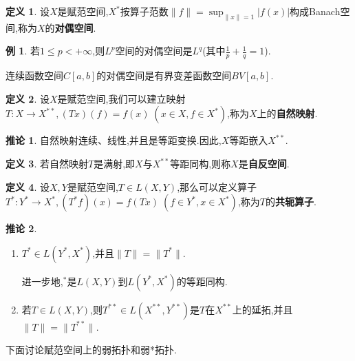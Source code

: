 \documentclass{ctexart}
\theoremstyle{definition}
\newtheorem{definition}{定义}
\newtheorem{example}{例}
\newtheorem{corollary}{推论}
\theoremstyle{remark}
\begin{document}
	\begin{definition}
		设$X$是赋范空间,$X^*$按算子范数$\|f\|=\sup_{\|x\|=1}{|f(x)|}$构成Banach空间,称为$X$的\textbf{对偶空间}.
	\end{definition}
	\begin{example}
		若$1\le p<+\infty$,则$L^p$空间的对偶空间是$L^q$(其中$\frac{1}{p}+\frac{1}{q}=1$).
		
		连续函数空间$C[a,b]$的对偶空间是有界变差函数空间$BV[a,b]$.
	\end{example}
	\begin{definition}
		设$X$是赋范空间,我们可以建立映射$T:X\to X^{**},(Tx)(f)=f(x)\;(x\in X,f\in X^*)$,称为$X$上的\textbf{自然映射}.
	\end{definition}
	\begin{corollary}
		自然映射连续、线性,并且是等距变换.因此,$X$等距嵌入$X^{**}$.
	\end{corollary}
	\begin{definition}
		若自然映射$T$是满射,即$X$与$X^{**}$等距同构,则称$X$是\textbf{自反空间}.
	\end{definition}
	\begin{definition}
		设$X,Y$是赋范空间,$T\in L(X,Y)$,那么可以定义算子$T^*:Y^*\to X^*,(T^*f)(x)=f(Tx)\;(f\in Y^*,x\in X^*)$,称为$T$的\textbf{共轭算子}.
	\end{definition}
	\begin{corollary}
		\begin{enumerate}
			\item $T^*\in L(Y^*,X^*)$,并且$\|T\|=\|T^*\|$.
			
			进一步地,$^*$是$L(X,Y)$到$L(Y^*,X^*)$的等距同构.
			
			\item 若$T\in L(X,Y)$,则$T^{**}\in L(X^{**},Y^{**})$是$T$在$X^{**}$上的延拓,并且$\|T\|=\|T^{**}\|$.
		\end{enumerate}
	\end{corollary}
	
	下面讨论赋范空间上的弱拓扑和弱*拓扑.
	
\end{document}
